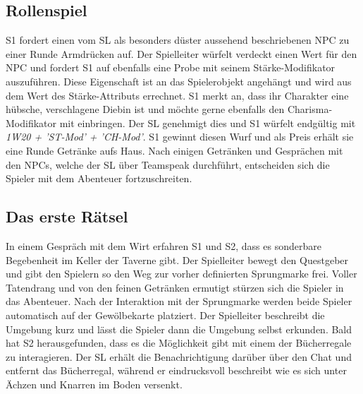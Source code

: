 \subsection{Rollenspiel}
\label{sec:Rollenspiel}

S1 fordert einen vom SL als besonders düster aussehend beschriebenen NPC zu einer Runde Armdrücken auf.\newline
Der Spielleiter würfelt verdeckt einen Wert für den NPC und fordert S1 auf ebenfalls eine Probe mit seinem Stärke-Modifikator auszuführen. Diese Eigenschaft ist an das Spielerobjekt angehängt und wird aus dem Wert des Stärke-Attributs errechnet. S1 merkt an, dass ihr Charakter eine hübsche, verschlagene Diebin ist und möchte gerne ebenfalls den Charisma-Modifikator mit einbringen. Der SL genehmigt dies und S1 würfelt endgültig mit \emph{1W20 + 'ST-Mod' + 'CH-Mod'}. S1 gewinnt diesen Wurf und als Preis erhält sie eine Runde Getränke aufs Haus.\newline
Nach einigen Getränken und Gesprächen mit den NPCs, welche der SL über Teamspeak durchführt, entscheiden sich die Spieler mit dem Abenteuer fortzuschreiten. 

\subsection{Das erste Rätsel}
\label{sec:DasErsteRätsel}

In einem Gespräch mit dem Wirt erfahren S1 und S2, dass es sonderbare Begebenheit im Keller der Taverne gibt. Der Spielleiter bewegt den Questgeber und gibt den Spielern so den Weg zur vorher definierten Sprungmarke frei.\newline
Voller Tatendrang und von den feinen Getränken ermutigt stürzen sich die Spieler in das Abenteuer. Nach der Interaktion mit der Sprungmarke werden beide Spieler automatisch auf der Gewölbekarte platziert. Der Spielleiter beschreibt die Umgebung kurz und lässt die Spieler dann die Umgebung selbst erkunden. Bald hat S2 herausgefunden, dass es die Möglichkeit gibt mit einem der Bücherregale zu interagieren. Der SL erhält die Benachrichtigung darüber über den Chat und entfernt das Bücherregal, während er eindrucksvoll beschreibt wie es sich unter Ächzen und Knarren im Boden versenkt.\newline


